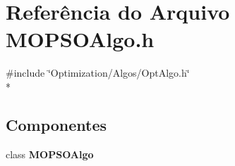 \section{Referência do Arquivo M\+O\+P\+S\+O\+Algo.\+h}
\label{_m_o_p_s_o_algo_8h}
{\ttfamily \#include \char`\"{}Optimization/\+Algos/\+Opt\+Algo.\+h\char`\"{}}\\*
\subsection*{Componentes}
\begin{DoxyCompactItemize}
\item 
class {\bf M\+O\+P\+S\+O\+Algo}
\end{DoxyCompactItemize}
